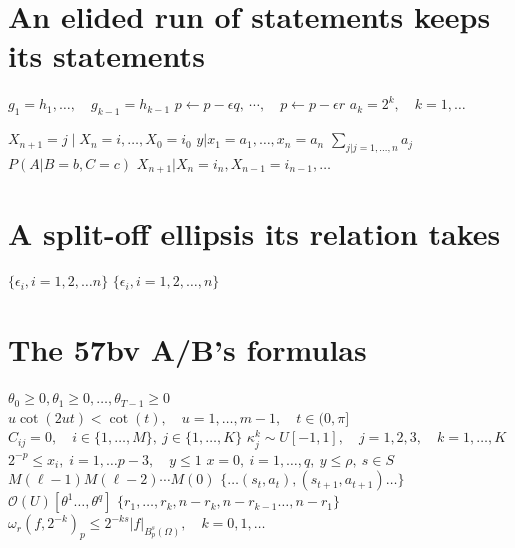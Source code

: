 \documentclass{article}
\begin{document}
\section{An elided run of statements keeps its statements}
$g_1=h_1,\dots,\quad g_{k-1}=h_{k-1}$ $p\leftarrow p-\epsilon q,\ \cdots,\quad p\leftarrow p-\epsilon r$
$a_k=2^k,\quad k=1,\ldots$

$X_{n+1}=j\mid X_n=i,\ldots,X_0=i_0$ $y|x_1=a_1,\ldots,x_n=a_n$ $\sum_{j|j=1,\ldots,n}a_j$ $P(A|B=b,C=c)$
$X_{n+1}|X_n=i_n,X_{n-1}=i_{n-1},\ldots$

\section{A split-off ellipsis its relation takes}
$\{\epsilon_{i}, i=1, 2,\ldots n\}$ $\{\epsilon_{i}, i=1, 2,\ldots, n\}$

\section{The 57bv A/B's formulas}
$\theta_0\geq 0,\theta_1\geq 0,\ldots,\theta_{T-1}\geq 0$ $u\cot(2ut)<\cot(t),\quad u=1,\ldots,m-1,\quad t\in(0,\pi]$
$C_{ij}=0,\quad i\in\{1,\ldots,M\},\ j\in\{1,\ldots,K\}$ $\kappa_j^k\sim U[-1,1],\quad j=1,2,3,\quad k=1,\ldots,K$
$2^{-p}\leq x_i,\;i=1,\dots p-3,\quad y\leq 1$ $x=0,\ i=1,\ldots,q,\ y\leq\rho,\ s\in S$
$M(\ell-1)M(\ell-2)\cdots M(0)$ $\{\dots(s_t,a_t),(s_{t+1},a_{t+1})\dots\}$ $\mathcal{O}(U)[\theta^{1}\ldots,\theta^{q}]$
$\{r_1,\dots,r_k,n-r_k,n-r_{k-1}\dots,n-r_1\}$ $\omega_{r}(f,2^{-k})_{p}\leq 2^{-ks}|f|_{B^{s}_{p}(\Omega)},\quad k=0,1,\ldots$
\end{document}
